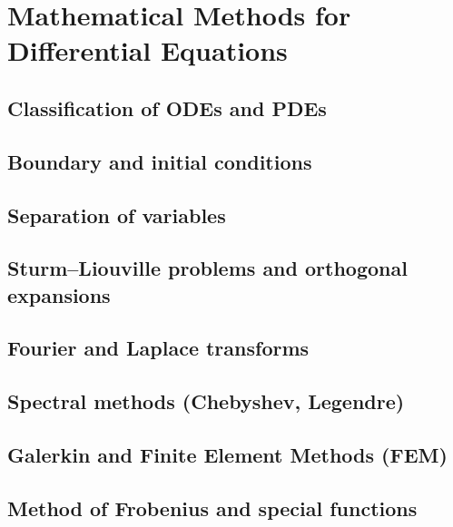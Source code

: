﻿\chapter{Mathematical Methods for Differential Equations}
\section{Classification of ODEs and PDEs}

\section{Boundary and initial conditions}

\section{Separation of variables}

\section{Sturm–Liouville problems and orthogonal expansions}

\section{Fourier and Laplace transforms}

\section{Spectral methods (Chebyshev, Legendre)}

\section{Galerkin and Finite Element Methods (FEM)}

\section{Method of Frobenius and special functions}


